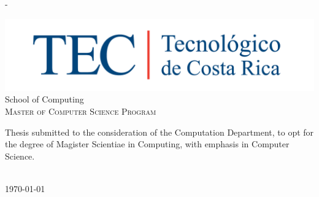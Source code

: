 \begin{titlingpage}
\begin{SingleSpace}
\begin{adjustwidth*}{\unitlength}{-\unitlength}
\begin{center}
\vspace{11mm}
\includegraphics[scale=0.2]{logos/LogoTEC.png}\\
\vspace{6mm}
{\large School of Computing\\
\textsc{Master of Computer Science Program}}\\
\vspace{11mm}
\begin{minipage}{10cm}
Thesis submitted to the consideration of the Computation Department, to opt
for the degree of Magister Scientiae in Computing, with emphasis in Computer Science.
\end{minipage}\\
\vspace{9mm}
{\large\textsc{\today}}
\vspace{12mm}
\end{center}
\begin{flushright}
\end{flushright}
\end{adjustwidth*}
\end{SingleSpace}
\end{titlingpage}